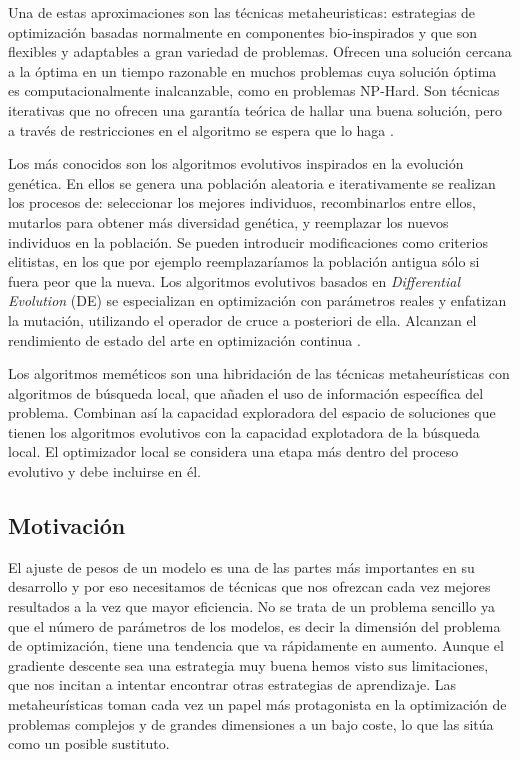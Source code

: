 Una de estas aproximaciones son las técnicas metaheuristicas: estrategias de optimización basadas normalmente en componentes bio-inspirados y que son flexibles y adaptables a gran variedad de problemas. Ofrecen una solución cercana a la óptima en un tiempo razonable en muchos problemas cuya solución óptima es computacionalmente inalcanzable, como en problemas NP-Hard. Son técnicas iterativas que no ofrecen una garantía teórica de hallar una buena solución, pero a través de restricciones en el algoritmo se espera que lo haga \cite{MHtrainingClase}.

Los más conocidos son los algoritmos evolutivos inspirados en la evolución genética. En ellos se genera una población aleatoria e iterativamente se realizan los procesos de: seleccionar los mejores individuos, recombinarlos entre ellos, mutarlos para obtener más diversidad genética, y reemplazar los nuevos individuos en la población. Se pueden introducir modificaciones como criterios elitistas, en los que por ejemplo reemplazaríamos la población antigua sólo si fuera peor que la nueva. Los algoritmos evolutivos basados en \textit{Differential Evolution} (DE) se especializan en optimización con parámetros reales y enfatizan la mutación, utilizando el operador de cruce a posteriori de ella. Alcanzan el rendimiento de estado del arte en optimización continua \cite{MHoverview}.

Los algoritmos meméticos son una hibridación de las técnicas metaheurísticas con algoritmos de búsqueda local, que añaden el uso de información específica del problema. Combinan así la capacidad exploradora del espacio de soluciones que tienen los algoritmos evolutivos con la capacidad explotadora de la búsqueda local. El optimizador local se considera una etapa más dentro del proceso evolutivo y debe incluirse en él.



\subsection{Motivación}
\label{sec:motinfo}

El ajuste de pesos de un modelo es una de las partes más importantes en su desarrollo y por eso necesitamos de técnicas que nos ofrezcan cada vez mejores resultados a la vez que mayor eficiencia. No se trata de un problema sencillo ya que el número de parámetros de los modelos, es decir la dimensión del problema de optimización, tiene una tendencia que va rápidamente en aumento. Aunque el gradiente descente sea una estrategia muy buena hemos visto sus limitaciones, que nos incitan a intentar encontrar otras estrategias de aprendizaje. Las metaheurísticas toman cada vez un papel más protagonista en la optimización de problemas complejos y de grandes dimensiones a un bajo coste, lo que las sitúa como un posible sustituto.

